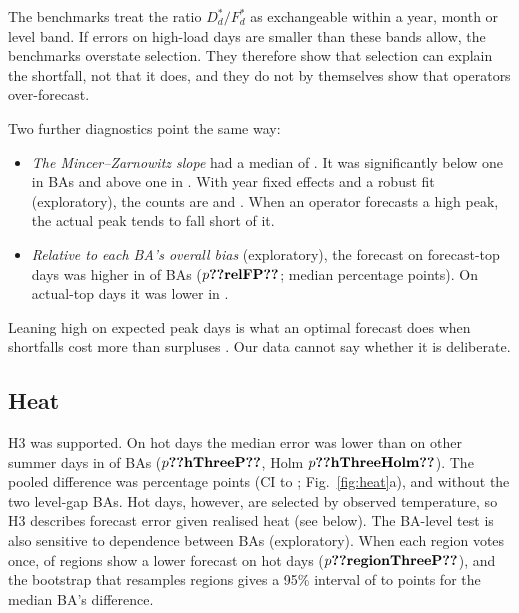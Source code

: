 \documentclass[conference,a4paper]{IEEEtran}
\begin{document}
The benchmarks treat the ratio $D^*_d/F^*_d$ as exchangeable within a year, month or level band. If errors on high-load days are smaller than these bands allow, the benchmarks overstate selection. They therefore show that selection can explain the shortfall, not that it does, and they do not by themselves show that operators over-forecast.

Two further diagnostics point the same way:
\begin{itemize}
\item \emph{The Mincer--Zarnowitz slope} had a median of . It was significantly below one in  BAs and above one in . With year fixed effects and a robust fit (exploratory), the counts are  and . When an operator forecasts a high peak, the actual peak tends to fall short of it.
\item \emph{Relative to each BA's overall bias} (exploratory), the forecast on forecast-top days was higher in  of  BAs ($p\res{relFP}$; median  percentage points). On actual-top days it was lower in .
\end{itemize}
Leaning high on expected peak days is what an optimal forecast does when shortfalls cost more than surpluses \cite{patton2007optimal}. Our data cannot say whether it is deliberate.

\subsection{Heat}
H3 was supported. On hot days the median error was lower than on other summer days in  of  BAs ($p\res{hThreeP}$, Holm $p\res{hThreeHolm}$). The pooled difference was  percentage points (CI  to ; Fig.~\ref{fig:heat}a), and  without the two level-gap BAs. Hot days, however, are selected by observed temperature, so H3 describes forecast error given realised heat (see below). The BA-level test is also sensitive to dependence between BAs (exploratory). When each region votes once,  of  regions show a lower forecast on hot days ($p\res{regionThreeP}$), and the bootstrap that resamples regions gives a 95\% interval of  to  points for the median BA's difference.
\end{document}
